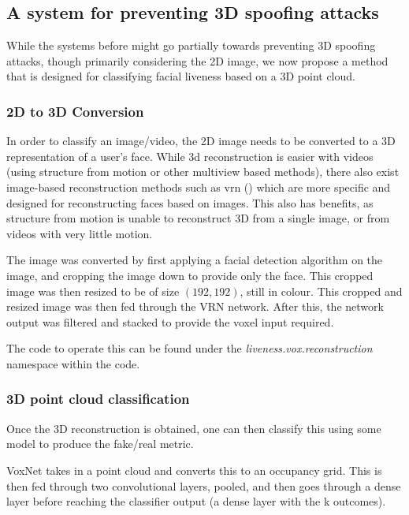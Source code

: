 \documentclass[10pt,a4paper]{article}
\begin{document}
    \subsection{A system for preventing 3D spoofing attacks}
        While the systems before might go partially towards preventing 3D spoofing attacks, though primarily considering the 2D image, we now propose a method
        that is designed for classifying facial liveness based on a 3D point cloud.

        \subsubsection{2D to 3D Conversion}
            In order to classify an image/video, the 2D image needs to be converted to a 3D representation of a user's face. While 3d reconstruction is easier with videos (using structure from motion or other multiview based methods),
            there also exist image-based reconstruction methods such as vrn (\citealt{3DReconstructionMethod}) which are more specific and designed for reconstructing faces based on images. This also has benefits, as structure from motion
            is unable to reconstruct 3D from a single image, or from videos with very little motion.

            The image was converted by first applying a facial detection algorithm on the image, and cropping the image down to provide only the face. This cropped image was then resized to
            be of size $(192, 192)$, still in colour. This cropped and resized image was then fed through the VRN network. After this, the network output was filtered and stacked to provide the voxel input required.

            The code to operate this can be found under the \emph{liveness.vox.reconstruction} namespace within the code.

        \subsubsection{3D point cloud classification}
            Once the 3D reconstruction is obtained, one can then classify this using some model to produce the fake/real metric.
            
            VoxNet takes in a point cloud and converts this to an occupancy grid. This is then fed through two convolutional layers,
            pooled, and then goes through a dense layer before reaching the classifier output (a dense layer with the k outcomes). 
\end{document}
